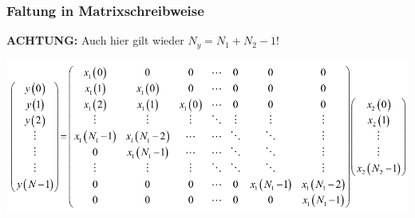 \documentclass[10pt,a4paper]{article}
\begin{document}
  \subsubsection{Faltung in Matrixschreibweise}
  \textbf{ACHTUNG:} Auch hier gilt wieder $N_{y}=N_{1}+N_{2}-1$!
  \begin{center}
    \includegraphics[width=.5\textwidth]{./img/Faltung_Matrixschreibweise.png}
\end{center}
\normalsize
\end{document}
